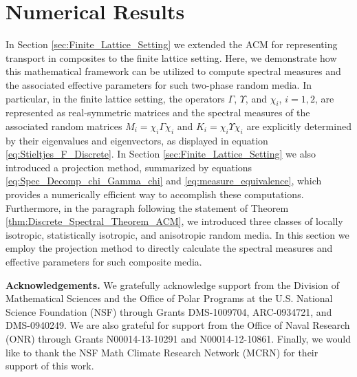 \documentclass[11pt]{amsart}
\begin{document}
\section{Numerical Results}\label{sec:Numerical_Results}
%
In Section \ref{sec:Finite_Lattice_Setting} we extended the ACM for
representing transport in composites to the finite lattice
setting. Here, we demonstrate how this mathematical 
framework can be utilized to compute spectral measures and the
associated effective parameters for such two-phase random media. In
particular, in the finite lattice setting, the operators $\Gamma$, $\Upsilon$, and 
$\chi_i$, $i=1,2$, are represented as real-symmetric matrices and the
spectral measures of the associated random matrices $M_i=\chi_i\Gamma\chi_i$ and 
$K_i=\chi_i\Upsilon\chi_i$ are explicitly determined by their eigenvalues and
eigenvectors, as displayed in equation
\eqref{eq:Stieltjes_F_Discrete}. In Section
\ref{sec:Finite_Lattice_Setting} we also introduced a projection method,
summarized by equations \eqref{eq:Spec_Decomp_chi_Gamma_chi} and
\eqref{eq:measure_equivalence}, which provides a numerically efficient
way to accomplish these computations. Furthermore, in the paragraph
following the statement of Theorem
\ref{thm:Discrete_Spectral_Theorem_ACM}, we introduced three 
classes of locally isotropic, statistically isotropic, and anisotropic
random media. In this section we employ the projection method to
directly calculate the spectral measures and effective parameters for
such composite media.




\medskip

{\bf Acknowledgements.}
We gratefully acknowledge support from the Division of Mathematical
Sciences and the Office of Polar Programs at the U.S. 
National Science Foundation (NSF) through Grants
DMS-1009704, ARC-0934721, and DMS-0940249. We are also grateful for 
support from the Office of Naval Research (ONR) through
Grants N00014-13-10291 and N00014-12-10861. Finally, we would like to 
thank the NSF Math Climate Research Network (MCRN) for their support
of this work. 


\medskip



\end{document}
